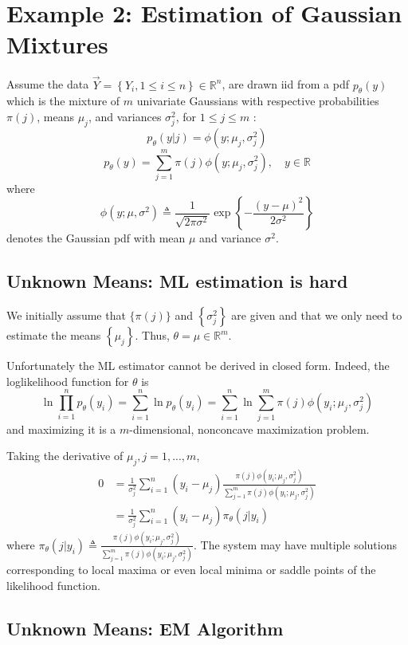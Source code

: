 \documentclass[11pt]{elegantbook}
\begin{document}
\section{Example 2: Estimation of Gaussian Mixtures}
Assume the data $\vec{Y}=\left\{Y_i, 1 \leq i \leq n\right\} \in \mathbb{R}^n$, are drawn iid from a pdf $p_\theta(y)$ which is the mixture of $m$ univariate Gaussians with respective probabilities $\pi(j)$, means $\mu_j$, and variances $\sigma_j^2$, for $1 \leq j \leq m$ :
$$p_\theta(y|j)=\phi\left(y ; \mu_j, \sigma_j^2\right)$$
$$
p_\theta(y)=\sum_{j=1}^m \pi(j) \phi\left(y ; \mu_j, \sigma_j^2\right), \quad y \in \mathbb{R}
$$
where
$$\phi\left(y ; \mu, \sigma^2\right) \triangleq \frac{1}{\sqrt{2 \pi \sigma^2}} \exp \left\{-\frac{(y-\mu)^2}{2 \sigma^2}\right\}$$
denotes the Gaussian pdf with mean $\mu$ and variance $\sigma^2$.
\subsection{Unknown Means: ML estimation is hard}
We initially assume that $\{\pi(j)\}$ and $\left\{\sigma_j^2\right\}$ are given and that we only need to estimate the means $\left\{\mu_j\right\}$. Thus, $\theta=\mu \in \mathbb{R}^m$.

Unfortunately the ML estimator cannot be derived in closed form. Indeed, the loglikelihood function for $\theta$ is
$$
\ln \prod_{i=1}^n p_\theta(y_i)=\sum_{i=1}^n \ln p_\theta\left(y_i\right)=\sum_{i=1}^n \ln \sum_{j=1}^m \pi(j) \phi\left(y_i ; \mu_j, \sigma_j^2\right)
$$
and maximizing it is a $m$-dimensional, nonconcave maximization problem.

Taking the derivative of $\mu_j, j=1,...,m$,
\begin{equation}
    \begin{aligned}
        0&=\frac{1}{\sigma^2_j}\sum_{i=1}^n(y_i-\mu_j)\frac{\pi(j)\phi(y_i ; \mu_j, \sigma_j^2)}{\sum_{j=1}^m\pi(j)\phi(y_i ; \mu_j, \sigma_j^2)}\\
        &=\frac{1}{\sigma^2_j}\sum_{i=1}^n(y_i-\mu_j)\pi_\theta(j|y_i)
    \end{aligned}
    \nonumber
\end{equation}
where $\pi_\theta(j|y_i)\triangleq \frac{\pi(j)\phi(y_i ; \mu_j, \sigma_j^2)}{\sum_{j=1}^m\pi(j)\phi(y_i ; \mu_j, \sigma_j^2)}$.
The system may have multiple solutions corresponding to local maxima or even local minima or saddle points of the likelihood function.

\subsection{Unknown Means: EM Algorithm}
\end{document}
